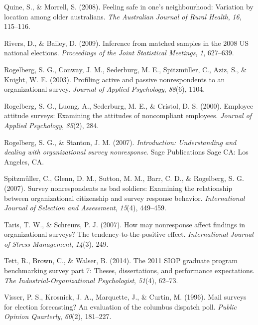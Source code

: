 \documentclass[
  man,mask]{apa7}
\newlength{\cslhangindent}
\newlength{\cslentryspacingunit} %
\newenvironment{CSLReferences}[2] %
 {%
  \setlength{\parindent}{0pt}
  \ifodd #1
  \let\oldpar\par
  \def\par{\hangindent=\cslhangindent\oldpar}
  \fi
  \setlength{\parskip}{#2\cslentryspacingunit}
 }%
 {}
\begin{document}
\begin{CSLReferences}{1}{0}
\leavevmode{}%
Quine, S., \& Morrell, S. (2008). Feeling safe in one's neighbourhood: Variation by location among older australians. \emph{The Australian Journal of Rural Health}, \emph{16}, 115--116.

\leavevmode{}%
Rivers, D., \& Bailey, D. (2009). Inference from matched samples in the 2008 {US} national elections. \emph{Proceedings of the Joint Statistical Meetings}, \emph{1}, 627--639.

\leavevmode{}%
Rogelberg, S. G., Conway, J. M., Sederburg, M. E., Spitzmüller, C., Aziz, S., \& Knight, W. E. (2003). Profiling active and passive nonrespondents to an organizational survey. \emph{Journal of Applied Psychology}, \emph{88}(6), 1104.

\leavevmode{}%
Rogelberg, S. G., Luong, A., Sederburg, M. E., \& Cristol, D. S. (2000). Employee attitude surveys: Examining the attitudes of noncompliant employees. \emph{Journal of Applied Psychology}, \emph{85}(2), 284.

\leavevmode{}%
Rogelberg, S. G., \& Stanton, J. M. (2007). \emph{Introduction: Understanding and dealing with organizational survey nonresponse}. Sage Publications Sage {CA}: Los Angeles, {CA}.

\leavevmode{}%
Spitzmüller, C., Glenn, D. M., Sutton, M. M., Barr, C. D., \& Rogelberg, S. G. (2007). Survey nonrespondents as bad soldiers: Examining the relationship between organizational citizenship and survey response behavior. \emph{International Journal of Selection and Assessment}, \emph{15}(4), 449--459.

\leavevmode{}%
Taris, T. W., \& Schreurs, P. J. (2007). How may nonresponse affect findings in organizational surveys? The tendency-to-the-positive effect. \emph{International Journal of Stress Management}, \emph{14}(3), 249.

\leavevmode{}%
Tett, R., Brown, C., \& Walser, B. (2014). The 2011 {SIOP} graduate program benchmarking survey part 7: Theses, dissertations, and performance expectations. \emph{The Industrial-Organizational Psychologist}, \emph{51}(4), 62--73.

\leavevmode{}%
Visser, P. S., Krosnick, J. A., Marquette, J., \& Curtin, M. (1996). Mail surveys for election forecasting? An evaluation of the columbus dispatch poll. \emph{Public Opinion Quarterly}, \emph{60}(2), 181--227.


\end{CSLReferences}
\end{document}
